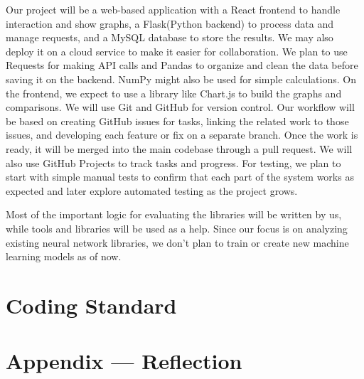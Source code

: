 \documentclass{article}
\begin{document}
Our project will be a web-based application with a React frontend to handle interaction and show graphs, a Flask(Python backend) to process data and manage requests, and a MySQL database to store the results. We may also deploy it on a cloud service to make it easier for collaboration. We plan to use Requests for making API calls and Pandas to organize and clean the data before saving it on the backend. NumPy might also be used for simple calculations. On the frontend, we expect to use a library like Chart.js to build the graphs and comparisons.
We will use Git and GitHub for version control. Our workflow will be based on creating GitHub issues for tasks, linking the related work to those issues, and developing each feature or fix on a separate branch. Once the work is ready, it will be merged into the main codebase through a pull request. We will also use GitHub Projects to track tasks and progress.
For testing, we plan to start with simple manual tests to confirm that each part of the system works as expected and later explore automated testing as the project grows.

Most of the important logic for evaluating the libraries will be written by us, while tools and libraries will be used as a help. Since our focus is on analyzing existing neural network libraries, we don’t plan to train or create new machine learning models as of now.
\section{Coding Standard}


\newpage{}

\section*{Appendix --- Reflection}


\end{document}
